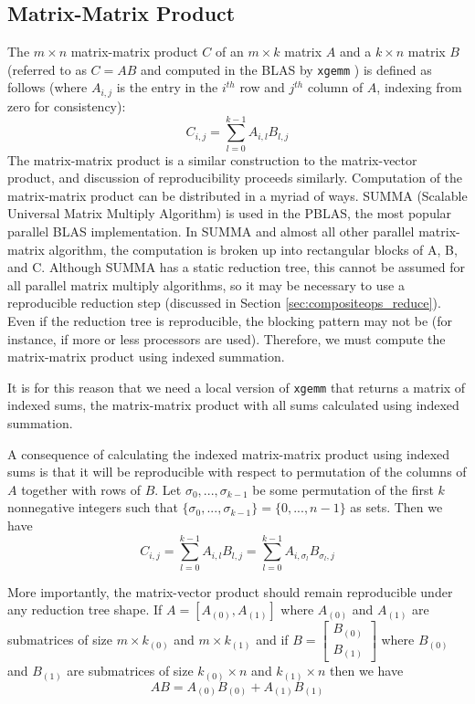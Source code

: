 \subsection{Matrix-Matrix Product}
  \label{sec:compositeops_gemm}
  The $m \times n$ matrix-matrix product $C$ of an $m \times k$ matrix $A$ and a $k \times n$ matrix $B$(referred to as $C = AB$ and computed in the BLAS by \texttt{xgemm} \cite{BLAS}) is defined as follows (where $A_{i, j}$ is the entry in the $i^{th}$ row and $j^{th}$ column of $A$, indexing from zero for consistency):
  \[
    C_{i, j} = \sum\limits_{l = 0}^{k - 1} A_{i, l}B_{l, j}
  \]
  The matrix-matrix product is a similar construction to the matrix-vector product, and discussion of reproducibility proceeds similarly.
  Computation of the matrix-matrix product can be distributed in a myriad of ways. SUMMA (Scalable Universal Matrix Multiply Algorithm) is used in the PBLAS, the most popular parallel BLAS implementation. In SUMMA and almost all other parallel matrix-matrix algorithm, the computation is broken up into rectangular blocks of A, B, and C. Although SUMMA has a static reduction tree, this cannot be assumed for all parallel matrix multiply algorithms, so it may be necessary to use a reproducible reduction step (discussed in Section \ref{sec:compositeops_reduce}).
  Even if the reduction tree is reproducible, the blocking pattern may not be (for instance, if more or less processors are used). Therefore, we must compute the matrix-matrix product using indexed summation.

  It is for this reason that we need a local version of \texttt{xgemm} that returns a matrix of indexed sums, the matrix-matrix product with all sums calculated using indexed summation.

  A consequence of calculating the indexed matrix-matrix product using indexed sums is that it will be reproducible with respect to permutation of the columns of $A$ together with rows of $B$.
  Let $\sigma_0, ..., \sigma_{k - 1}$ be some permutation of the first $k$ nonnegative integers such that $\{\sigma_0, ..., \sigma_{k - 1}\} = \{0, ..., n - 1\}$ as sets. Then we have
  \[
    C_{i, j} = \sum\limits_{l = 0}^{k - 1} A_{i, l}B_{l, j} = \sum\limits_{l = 0}^{k - 1} A_{i, \sigma_l}B_{\sigma_l, j}
  \]

  More importantly, the matrix-vector product should remain reproducible under any reduction tree shape.
  If $A = [A_{(0)}, A_{(1)}]$ where $A_{(0)}$ and $A_{(1)}$ are submatrices of size $m \times k_{(0)}$ and $m \times k_{(1)}$ and if $B = \left[\begin{array}{c}B_{(0)}\\ B_{(1)}\end{array}\right]$ where $B_{(0)}$ and $B_{(1)}$ are submatrices of size $k_{(0)} \times n$ and $k_{(1)} \times n$ then we have 
  \[
    AB = A_{(0)}B_{(0)} + A_{(1)}B_{(1)}
  \]


